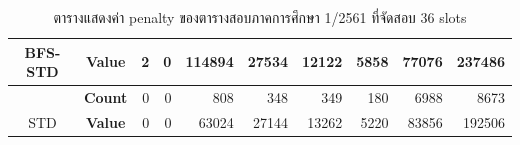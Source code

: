 \begin{table}[]
{\begin{tabular}{@{}ccrrrrrrrr@{}}
    \multirow{-2}{*}{BFS-STD}                    & \textbf{Value}                        & 2                              & 0                              & 114894                         & 27534                          & 12122                          & 5858                           & 77076                          & 237486                           \\ \midrule
    {\color[HTML]{FE0000} }                      & {\color[HTML]{FE0000} \textbf{Count}} & {\color[HTML]{FE0000} 0}       & {\color[HTML]{FE0000} 0}       & {\color[HTML]{FE0000} 808}     & {\color[HTML]{FE0000} 348}     & {\color[HTML]{FE0000} 349}     & {\color[HTML]{FE0000} 180}     & {\color[HTML]{FE0000} 6988}    & {\color[HTML]{FE0000} 8673}      \\ \cmidrule(l){2-10} 
    \multirow{-2}{*}{{\color[HTML]{FE0000} STD}} & {\color[HTML]{FE0000} \textbf{Value}} & {\color[HTML]{FE0000} 0}       & {\color[HTML]{FE0000} 0}       & {\color[HTML]{FE0000} 63024}   & {\color[HTML]{FE0000} 27144}   & {\color[HTML]{FE0000} 13262}   & {\color[HTML]{FE0000} 5220}    & {\color[HTML]{FE0000} 83856}   & {\color[HTML]{FE0000} 192506}    \\ \bottomrule
    \end{tabular}%
    }
    \caption{ตารางแสดงค่า penalty ของตารางสอบภาคการศึกษา 1/2561 ที่จัดสอบ 36 slots}
    \label{tab:result_table_161_36}
\end{table}
